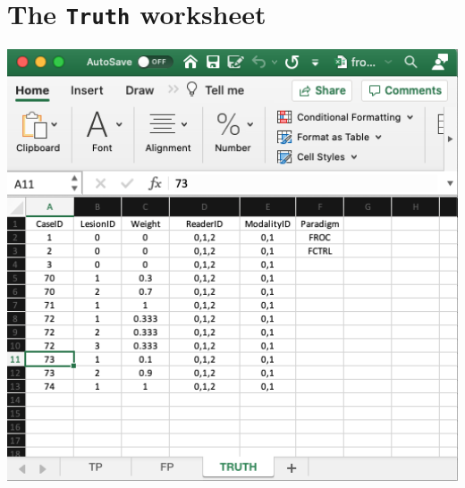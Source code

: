 \documentclass[
]{book}
\begin{document}
\hypertarget{quick-start-froc-data-truth}{%
\section{\texorpdfstring{The \texttt{Truth} worksheet}{The Truth worksheet}}\label{quick-start-froc-data-truth}}

\includegraphics[width=1\textwidth,height=\textheight]{images/quick-start/frocCrTruth.png}
\end{document}
